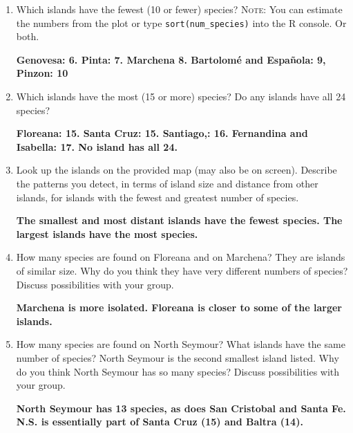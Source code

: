 \documentclass[11pt]{article}
\begin{document}
\begin{enumerate}[resume]
\item Which islands have the fewest (10 or fewer) species? \textsc{Note:} You can estimate the numbers from the plot or type \texttt{sort(num\_species)} into the R console. Or both.

\textbf{Genovesa: 6. Pinta: 7. Marchena 8. Bartolomé and Española: 9, Pinzon: 10}

\vspace{2\baselineskip}

\item Which islands have the most (15 or more) species? Do any islands have all 24 species?

\textbf{Floreana: 15. Santa Cruz: 15. Santiago,: 16. Fernandina and Isabella: 17. No island has all 24.}

\vspace{2\baselineskip}

\item Look up the islands on the provided map (may also be on screen). Describe the patterns you detect, in terms of island size and distance from other islands, for islands with the fewest and greatest number of species.

\textbf{The smallest and most distant islands have the fewest species. The largest islands have the most species.}

\vspace{2\baselineskip}

\item How many species are found on Floreana and on Marchena? They are islands of similar size. Why do you think they have very different numbers of species? Discuss possibilities with your group.

\textbf{Marchena is more isolated. Floreana is closer to some of the larger islands.}

\vspace{2\baselineskip}

\item How many species are found on North Seymour? What islands have the same number of species? North Seymour is the second smallest island listed. Why do you think North Seymour has so many species? Discuss possibilities with your group.

\textbf{North Seymour has 13 species, as does San Cristobal and Santa Fe. N.S. is essentially part of Santa Cruz (15) and Baltra (14).}

\end{enumerate}
\end{document}

